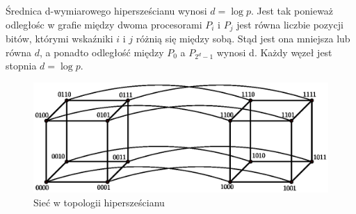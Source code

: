 Średnica d-wymiarowego hipersześcianu wynosi \(d=\log{p}\). Jest tak ponieważ odległośc w grafie między dwoma procesorami \(P_i\) i \(P_j\) jest równa liczbie pozycji bitów, którymi wskaźniki \(i\) i \(j\) różnią się między sobą. Stąd jest ona mniejsza lub równa \(d\), a ponadto odległość między \(P_0\) a \(P_{2^d-1}\) wynosi d. Każdy węzeł jest stopnia \(d=\log{p}\).

\begin{figure}[h]
\centering
\includegraphics[width=36em]{images/systolic.eps}
\caption{Sieć w topologii hipersześcianu}
\label{fig:systolic}
\end{figure}